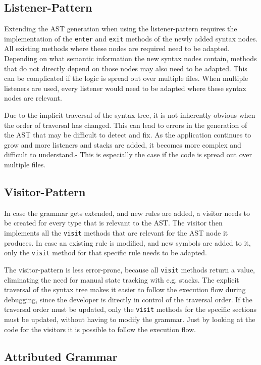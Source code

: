 \subsection{Listener-Pattern}

Extending the AST generation when using the listener-pattern requires the implementation of the \verb|enter| and \verb|exit| methods of the newly added syntax nodes. All existing methods where these nodes are required need to be adapted. Depending on what semantic information the new syntax nodes contain, methods that do not directly depend on those nodes may also need to be adapted. This can be complicated if the logic is spread out over multiple files. When multiple listeners are used, every listener would need to be adapted where these syntax nodes are relevant. 

Due to the implicit traversal of the syntax tree, it is not inherently obvious when the order of traversal has changed. This can lead to errors in the generation of the AST that may be difficult to detect and fix. As the application continues to grow and more listeners and stacks are added, it becomes more complex and difficult to understand.- This is especially the case if the code is spread out over multiple files.  

\subsection{Visitor-Pattern}

In case the grammar gets extended, and new rules are added, a visitor needs to be created for every type that is relevant to the AST. The visitor then implements all the \verb|visit| methods that are relevant for the AST node it produces. In case an existing rule is modified, and new symbols are added to it, only the \verb|visit| method for that specific rule needs to be adapted. 

The visitor-pattern is less error-prone, because all \verb|visit| methods return a value, eliminating the need for manual state tracking with e.g. stacks. The explicit traversal of the syntax tree makes it easier to follow the execution flow during debugging, since the developer is directly in control of the traversal order. If the traversal order must be updated, only the \verb|visit| methods for the specific sections must be updated, without having to modify the grammar. Just by looking at the code for the visitors it is possible to follow the execution flow.

\subsection{Attributed Grammar}

